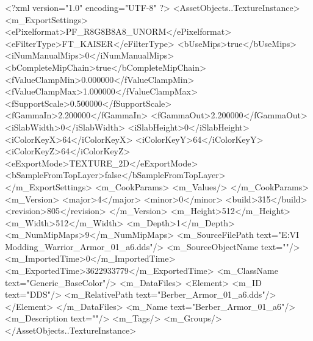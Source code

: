 <?xml version="1.0" encoding="UTF-8" ?>
<AssetObjects..TextureInstance>
	<m_ExportSettings>
		<ePixelformat>PF_R8G8B8A8_UNORM</ePixelformat>
		<eFilterType>FT_KAISER</eFilterType>
		<bUseMips>true</bUseMips>
		<iNumManualMips>0</iNumManualMips>
		<bCompleteMipChain>true</bCompleteMipChain>
		<fValueClampMin>0.000000</fValueClampMin>
		<fValueClampMax>1.000000</fValueClampMax>
		<fSupportScale>0.500000</fSupportScale>
		<fGammaIn>2.200000</fGammaIn>
		<fGammaOut>2.200000</fGammaOut>
		<iSlabWidth>0</iSlabWidth>
		<iSlabHeight>0</iSlabHeight>
		<iColorKeyX>64</iColorKeyX>
		<iColorKeyY>64</iColorKeyY>
		<iColorKeyZ>64</iColorKeyZ>
		<eExportMode>TEXTURE_2D</eExportMode>
		<bSampleFromTopLayer>false</bSampleFromTopLayer>
	</m_ExportSettings>
	<m_CookParams>
		<m_Values/>
	</m_CookParams>
	<m_Version>
		<major>4</major>
		<minor>0</minor>
		<build>315</build>
		<revision>805</revision>
	</m_Version>
	<m_Height>512</m_Height>
	<m_Width>512</m_Width>
	<m_Depth>1</m_Depth>
	<m_NumMipMaps>9</m_NumMipMaps>
	<m_SourceFilePath text="E:\Network\Civ VI Modding\Arer_Warrior\Textures\Berber_Armor_01_a6.dds"/>
	<m_SourceObjectName text=""/>
	<m_ImportedTime>0</m_ImportedTime>
	<m_ExportedTime>3622933779</m_ExportedTime>
	<m_ClassName text="Generic_BaseColor"/>
	<m_DataFiles>
		<Element>
			<m_ID text="DDS"/>
			<m_RelativePath text="Berber_Armor_01_a6.dds"/>
		</Element>
	</m_DataFiles>
	<m_Name text="Berber_Armor_01_a6"/>
	<m_Description text=""/>
	<m_Tags/>
	<m_Groups/>
</AssetObjects..TextureInstance>

